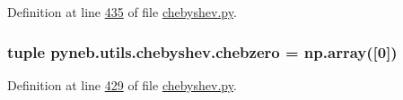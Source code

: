 Definition at line \hyperlink{chebyshev_8py_source_l00435}{435} of file \hyperlink{chebyshev_8py_source}{chebyshev.\+py}.

\hypertarget{namespacepyneb_1_1utils_1_1chebyshev_ad707fa9ec865920c2d8eedf6dfedf21c}{}
\subsubsection[{chebzero}]{\setlength{\rightskip}{0pt plus 5cm}tuple pyneb.\+utils.\+chebyshev.\+chebzero = np.\+array(\mbox{[}0\mbox{]})}\label{namespacepyneb_1_1utils_1_1chebyshev_ad707fa9ec865920c2d8eedf6dfedf21c}


Definition at line \hyperlink{chebyshev_8py_source_l00429}{429} of file \hyperlink{chebyshev_8py_source}{chebyshev.\+py}.

